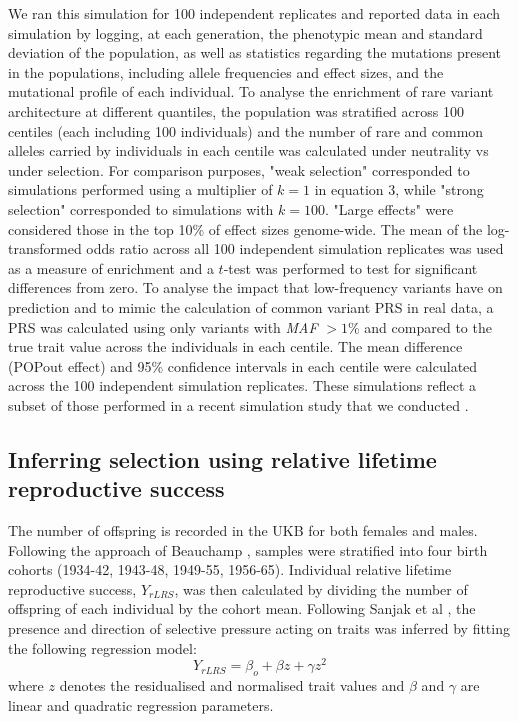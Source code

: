 \documentclass[12pt]{zHenriquesLab-StyleBioRxiv}
\begin{document}
We ran this simulation for 100 independent replicates and reported
data in each simulation by logging, at each generation, the phenotypic
mean and standard deviation of the population, as well as statistics
regarding the mutations present in the populations, including allele
frequencies and effect sizes, and the mutational profile of each
individual.  To analyse the enrichment of rare variant architecture at
different quantiles, the population was stratified across 100 centiles
(each including 100 individuals) and the number of rare and common
alleles carried by individuals in each centile was calculated under
neutrality vs under selection.  For comparison purposes, "weak
selection" corresponded to simulations performed using a multiplier of
$k=1$ in equation 3, while "strong selection" corresponded to
simulations with $k=100$. "Large effects" were considered those in the
top 10\% of effect sizes genome-wide.  The mean of the log-transformed
odds ratio across all 100 independent simulation replicates was used
as a measure of enrichment and a $t$-test was performed to test for
significant differences from zero.  To analyse the impact that
low-frequency variants have on prediction and to mimic the calculation
of common variant PRS in real data, a PRS was calculated using only
variants with \emph{MAF} $>1\%$ and compared to the true trait value
across the individuals in each centile.  The mean difference (POPout
effect) and 95\% confidence intervals in each centile were calculated
across the 100 independent simulation replicates. These simulations
reflect a subset of those performed in a recent simulation study that
we conducted \cite{Ori2024}.



\subsection*{Inferring selection using relative lifetime reproductive success}
The number of offspring is recorded in the UKB for both females and
males. Following the approach of Beauchamp \cite{v_select2}, samples were 
stratified into four birth cohorts (1934-42, 1943-48, 1949-55, 1956-65). Individual relative
lifetime reproductive success, $Y_{rLRS}$, was then calculated by
dividing the number of offspring of each individual by the cohort
mean. Following Sanjak et al \cite{Sanjak2018}, the presence and
direction of selective pressure acting on traits was inferred by
fitting the following regression model:
\begin{equation}
Y_{rLRS} = \beta_o + \beta z + \gamma z^2 \label{math:LRS}
\end{equation}
where $z$ denotes the residualised and normalised trait values and
$\beta$ and $\gamma$ are linear and quadratic regression parameters.
\end{document}
